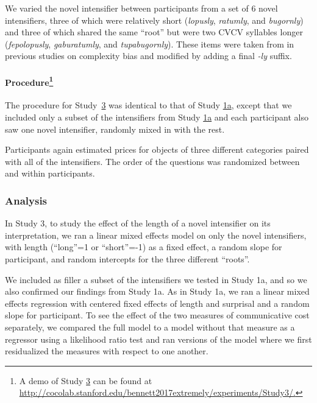 \documentclass[10pt,letterpaper]{article}
\newcommand{\w}[1]{\emph{#1}}
\begin{document}
We varied the novel intensifier between participants from a set of 6 novel intensifiers, three of which were relatively short (\w{lopusly}, \w{ratumly}, and \w{bugornly}) and three of which shared the same ``root'' but were two CVCV syllables longer (\w{fepolopusly}, \w{gaburatumly}, and \w{tupabugornly}).
These items were taken from in previous studies on complexity bias \cite{lewis_conceptual_2016} and modified by adding a final \w{-ly} suffix.

\paragraph{Procedure\footnote{A demo of Study \hyperref[sec:study3]{3} can be found at \url{http://cocolab.stanford.edu/bennett2017extremely/experiments/Study3/.}}}

The procedure for Study~\hyperref[sec:study3]{3} was identical to that of Study \hyperref[sec:study1a]{1a}, except that we included only a subset of the intensifiers from Study \hyperref[sec:study1a]{1a} and each participant also saw one novel intensifier, randomly mixed in with the rest.

Participants again estimated prices for objects of three different categories paired with all of the intensifiers.
The order of the questions was randomized between and within participants.

\subsubsection{Analysis}

In Study 3,  to study the effect of the length of a novel intensifier on its interpretation, we ran a linear mixed effects model on only the novel intensifiers, with length (``long''=1 or ``short''=-1) as a fixed effect, a random slope for participant, and random intercepts for the three different ``roots''.

We included as filler a subset of the intensifiers we tested in Study 1a, and so we also confirmed our findings from Study 1a.
As in Study 1a, we ran a linear mixed effects regression with centered fixed effects of length and surprisal and a random slope for participant.
%
To see the effect of the two measures of communicative cost separately, we compared the full model to a model without that measure as a regressor using a likelihood ratio test and ran versions of the model where we first residualized the measures with respect to one another.
\end{document}
